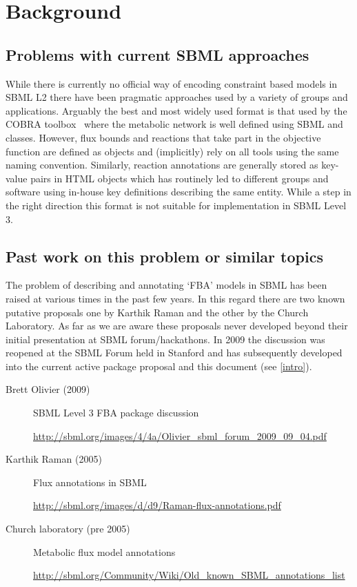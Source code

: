 
\section{ Background }
\label{background}

\subsection{ Problems with current SBML approaches }

While there is currently no official way of encoding constraint based models in SBML L2 there have been pragmatic approaches used by a variety of groups and applications. Arguably the best and most widely used format is that used by the \textsf{COBRA toolbox}~\citep{cobra} where the metabolic network is well defined using SBML \Reaction and \Species classes. However, flux bounds and reactions that take part in the objective function are defined as \LocalParameter objects and (implicitly) rely on all tools using the same naming convention. Similarly, reaction annotations are generally stored as key-value pairs in HTML \Notes objects which has routinely led to different groups and software using in-house key definitions describing the same entity. While a step in the right direction this format is not suitable for implementation in SBML Level 3.


\subsection{ Past work on this problem or similar topics }
The problem of describing and annotating `FBA' models in SBML has been raised  at various times in the past few years. In this regard there are two known putative proposals one by Karthik Raman and the other by the Church Laboratory. As far as we are aware these proposals never developed beyond their initial presentation at SBML forum/hackathons. In 2009 the discussion was reopened at the SBML Forum held in Stanford and has subsequently developed into the current active package proposal and this document (see \ref{intro}).

\begin{description}
  \item[Brett Olivier (2009)] SBML Level 3 FBA package discussion
  \item[]\url{http://sbml.org/images/4/4a/Olivier_sbml_forum_2009_09_04.pdf}
  \item[Karthik Raman (2005)] Flux annotations in SBML
  \item[]\url{http://sbml.org/images/d/d9/Raman-flux-annotations.pdf}
  \item[Church laboratory (pre 2005)] Metabolic flux model annotations
  \item[]\url{http://sbml.org/Community/Wiki/Old_known_SBML_annotations_list}
\end{description}




